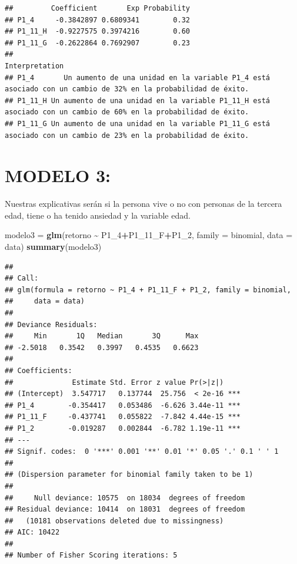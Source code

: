 \documentclass[
]{article}
\newenvironment{Shaded}{\begin{snugshade}}{\end{snugshade}}
\newcommand{\AttributeTok}[1]{\textcolor[rgb]{0.13,0.29,0.53}{#1}}
\newcommand{\FunctionTok}[1]{\textcolor[rgb]{0.13,0.29,0.53}{\textbf{#1}}}
\newcommand{\NormalTok}[1]{#1}
\newcommand{\OtherTok}[1]{\textcolor[rgb]{0.56,0.35,0.01}{#1}}
\newcommand{\SpecialCharTok}[1]{\textcolor[rgb]{0.81,0.36,0.00}{\textbf{#1}}}
\begin{document}
\begin{verbatim}
##         Coefficient       Exp Probability
## P1_4     -0.3842897 0.6809341        0.32
## P1_11_H  -0.9227575 0.3974216        0.60
## P1_11_G  -0.2622864 0.7692907        0.23
##                                                                                                          Interpretation
## P1_4       Un aumento de una unidad en la variable P1_4 está asociado con un cambio de 32% en la probabilidad de éxito.
## P1_11_H Un aumento de una unidad en la variable P1_11_H está asociado con un cambio de 60% en la probabilidad de éxito.
## P1_11_G Un aumento de una unidad en la variable P1_11_G está asociado con un cambio de 23% en la probabilidad de éxito.
\end{verbatim}

\hypertarget{modelo-3}{%
\section{MODELO 3:}\label{modelo-3}}

Nuestras explicativas serán si la persona vive o no con personas de la
tercera edad, tiene o ha tenido ansiedad y la variable edad.

\begin{Shaded}
\begin{Highlighting}[]
\NormalTok{modelo3 }\OtherTok{=} \FunctionTok{glm}\NormalTok{(retorno }\SpecialCharTok{\textasciitilde{}}\NormalTok{ P1\_4}\SpecialCharTok{+}\NormalTok{P1\_11\_F}\SpecialCharTok{+}\NormalTok{P1\_2, }\AttributeTok{family =}\NormalTok{ binomial, }\AttributeTok{data =}\NormalTok{ data)}
\FunctionTok{summary}\NormalTok{(modelo3)}
\end{Highlighting}
\end{Shaded}

\begin{verbatim}
## 
## Call:
## glm(formula = retorno ~ P1_4 + P1_11_F + P1_2, family = binomial, 
##     data = data)
## 
## Deviance Residuals: 
##     Min       1Q   Median       3Q      Max  
## -2.5018   0.3542   0.3997   0.4535   0.6623  
## 
## Coefficients:
##              Estimate Std. Error z value Pr(>|z|)    
## (Intercept)  3.547717   0.137744  25.756  < 2e-16 ***
## P1_4        -0.354417   0.053486  -6.626 3.44e-11 ***
## P1_11_F     -0.437741   0.055822  -7.842 4.44e-15 ***
## P1_2        -0.019287   0.002844  -6.782 1.19e-11 ***
## ---
## Signif. codes:  0 '***' 0.001 '**' 0.01 '*' 0.05 '.' 0.1 ' ' 1
## 
## (Dispersion parameter for binomial family taken to be 1)
## 
##     Null deviance: 10575  on 18034  degrees of freedom
## Residual deviance: 10414  on 18031  degrees of freedom
##   (10181 observations deleted due to missingness)
## AIC: 10422
## 
## Number of Fisher Scoring iterations: 5
\end{verbatim}
\end{document}
